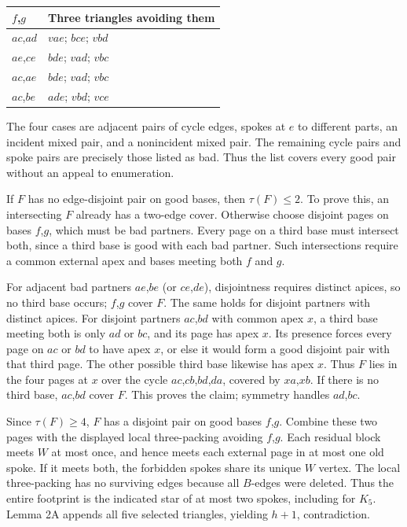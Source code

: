 \documentclass[11pt]{article}
\begin{document}
{\def\LTcaptype{none} %
{\small\begin{longtable}[]{@{}ll@{}}
\toprule\noalign{}
\(f\),\(g\) & Three triangles avoiding them \\
\midrule\noalign{}
\endhead
\bottomrule\noalign{}
\endlastfoot
\(ac\),\(ad\) & \(vae\); \(bce\); \(vbd\) \\
\(ae\),\(ce\) & \(bde\); \(vad\); \(vbc\) \\
\(ac\),\(ae\) & \(bde\); \(vad\); \(vbc\) \\
\(ac\),\(be\) & \(ade\); \(vbd\); \(vce\) \\
\end{longtable}}
}

The four cases are adjacent pairs of cycle edges, spokes at \(e\) to
different parts, an incident mixed pair, and a nonincident mixed pair.
The remaining cycle pairs and spoke pairs are precisely those listed as
bad. Thus the list covers every good pair without an appeal to
enumeration.

If \(F\) has no edge-disjoint pair on good bases, then \(\tau(F)\le 2\).
To prove this, an intersecting \(F\) already has a two-edge cover.
Otherwise choose disjoint pages on bases \(f\),\(g\), which must be bad
partners. Every page on a third base must intersect both, since a third
base is good with each bad partner. Such intersections require a common
external apex and bases meeting both \(f\) and \(g\).

For adjacent bad partners \(ae\),\(be\) (or \(ce\),\(de\)), disjointness
requires distinct apices, so no third base occurs; \(f\),\(g\) cover
\(F\). The same holds for disjoint partners with distinct apices. For
disjoint partners \(ac\),\(bd\) with common apex \(x\), a third base
meeting both is only \(ad\) or \(bc\), and its page has apex \(x\). Its
presence forces every page on \(ac\) or \(bd\) to have apex \(x\), or
else it would form a good disjoint pair with that third page. The other
possible third base likewise has apex \(x\). Thus \(F\) lies in the four
pages at \(x\) over the cycle \(ac\),\(cb\),\(bd\),\(da\), covered by
\(xa\),\(xb\). If there is no third base, \(ac\),\(bd\) cover \(F\).
This proves the claim; symmetry handles \(ad\),\(bc\).

Since \(\tau(F)\ge 4\), \(F\) has a disjoint pair on good bases
\(f\),\(g\). Combine these two pages with the displayed local
three-packing avoiding \(f\),\(g\). Each residual block meets \(W\) at
most once, and hence meets each external page in at most one old spoke.
If it meets both, the forbidden spokes share its unique \(W\) vertex.
The local three-packing has no surviving edges because all \(B\)-edges
were deleted. Thus the entire footprint is the indicated star of at most
two spokes, including for \(K_5\). Lemma 2A appends all five selected
triangles, yielding \(h+1\), contradiction.
\end{document}
